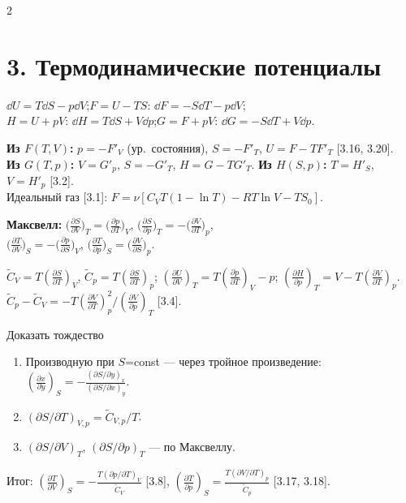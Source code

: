 \documentclass[10pt]{article}
\newcommand{\see}[1]{\textcolor{excol}{[#1]}}
\begin{document}
\begin{multicols}{2}
\section*{3. Термодинамические потенциалы}

$\dd U=T\dd S-p\dd V$;\quad $F=U-TS$: $\dd F=-S\dd T-p\dd V$;
\\$H=U+pV$: $\dd H=T\dd S+V\dd p$;\quad $G=F+pV$: $\dd G=-S\dd T+V\dd p$.

\textbf{Из $F(T,V)$:} $p=-F'_V$ (ур.\ состояния), $S=-F'_T$, $U=F-TF'_T$ \see{3.16, 3.20}.
\\\textbf{Из $G(T,p)$:} $V=G'_p$, $S=-G'_T$, $H=G-TG'_T$. \textbf{Из $H(S,p)$:} $T=H'_S$, $V=H'_p$ \see{3.2}.
\\Идеальный газ \see{3.1}: $F=\nu[C_VT(1-\ln T)-RT\ln V-TS_0]$.

\textbf{Максвелл:}
$\big(\frac{\partial S}{\partial V}\big)_T=\big(\frac{\partial p}{\partial T}\big)_V$,\;
$\big(\frac{\partial S}{\partial p}\big)_T=-\big(\frac{\partial V}{\partial T}\big)_p$,
\\$\big(\frac{\partial T}{\partial V}\big)_S=-\big(\frac{\partial p}{\partial S}\big)_V$,\;
$\big(\frac{\partial T}{\partial p}\big)_S=\big(\frac{\partial V}{\partial S}\big)_p$.

$\widetilde C_V=T(\frac{\partial S}{\partial T})_V$, $\widetilde C_p=T(\frac{\partial S}{\partial T})_p$;\;
$(\frac{\partial U}{\partial V})_T=T(\frac{\partial p}{\partial T})_V-p$;\;
$(\frac{\partial H}{\partial p})_T=V-T(\frac{\partial V}{\partial T})_p$.
\\$\widetilde C_p-\widetilde C_V=-T(\frac{\partial V}{\partial T})_p^2/(\frac{\partial V}{\partial p})_T$ \see{3.4}.

\begin{method}{Доказать тождество}
\begin{enumerate}
\item Производную при $S$=const — через тройное произведение:
$(\frac{\partial x}{\partial y})_S=-\frac{(\partial S/\partial y)_x}{(\partial S/\partial x)_y}$.
\item $(\partial S/\partial T)_{V,p}=\widetilde C_{V,p}/T$.
\item $(\partial S/\partial V)_T$, $(\partial S/\partial p)_T$ — по Максвеллу.
\end{enumerate}
Итог: $(\frac{\partial T}{\partial V})_S=-\frac{T(\partial p/\partial T)_V}{\widetilde C_V}$ \see{3.8},
$(\frac{\partial T}{\partial p})_S=\frac{T(\partial V/\partial T)_p}{\widetilde C_p}$ \see{3.17, 3.18}.
\end{method}


\end{multicols}
\end{document}
